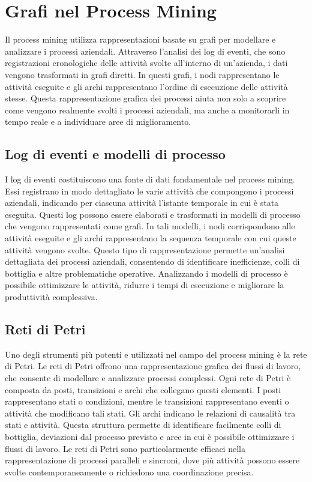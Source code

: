 \documentclass{article}
\begin{document}
\section{Grafi nel Process Mining}

Il process mining utilizza rappresentazioni basate su grafi per modellare e analizzare i processi aziendali. Attraverso l'analisi dei log di eventi, che sono registrazioni cronologiche delle attività svolte all'interno di un'azienda, i dati vengono trasformati in grafi diretti. In questi grafi, i nodi rappresentano le attività eseguite e gli archi rappresentano l'ordine di esecuzione delle attività stesse. Questa rappresentazione grafica dei processi aiuta non solo a scoprire come vengono realmente svolti i processi aziendali, ma anche a monitorarli in tempo reale e a individuare aree di miglioramento.

\subsection{Log di eventi e modelli di processo}

I log di eventi costituiscono una fonte di dati fondamentale nel process mining. Essi registrano in modo dettagliato le varie attività che compongono i processi aziendali, indicando per ciascuna attività l'istante temporale in cui è stata eseguita. Questi log possono essere elaborati e trasformati in modelli di processo che vengono rappresentati come grafi. In tali modelli, i nodi corrispondono alle attività eseguite e gli archi rappresentano la sequenza temporale con cui queste attività vengono svolte. Questo tipo di rappresentazione permette un'analisi dettagliata dei processi aziendali, consentendo di identificare inefficienze, colli di bottiglia e altre problematiche operative. Analizzando i modelli di processo è possibile ottimizzare le attività, ridurre i tempi di esecuzione e migliorare la produttività complessiva.

\subsection{Reti di Petri}

Uno degli strumenti più potenti e utilizzati nel campo del process mining è la rete di Petri. Le reti di Petri offrono una rappresentazione grafica dei flussi di lavoro, che consente di modellare e analizzare processi complessi. Ogni rete di Petri è composta da posti, transizioni e archi che collegano questi elementi. I posti rappresentano stati o condizioni, mentre le transizioni rappresentano eventi o attività che modificano tali stati. Gli archi indicano le relazioni di causalità tra stati e attività. Questa struttura permette di identificare facilmente colli di bottiglia, deviazioni dal processo previsto e aree in cui è possibile ottimizzare i flussi di lavoro. Le reti di Petri sono particolarmente efficaci nella rappresentazione di processi paralleli e sincroni, dove più attività possono essere svolte contemporaneamente o richiedono una coordinazione precisa.
\end{document}
